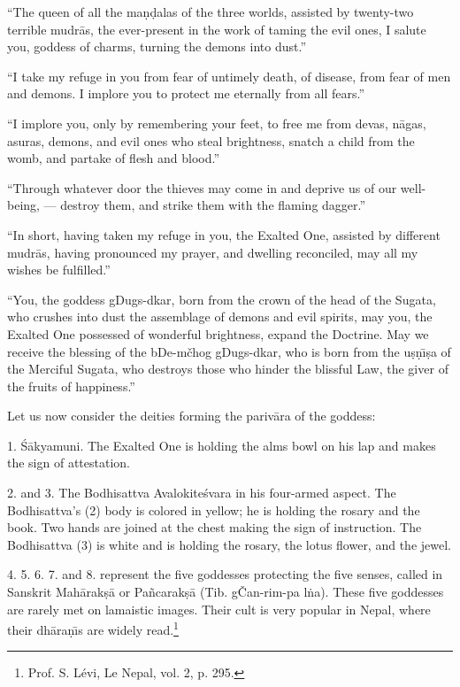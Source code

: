 \documentclass[a4paper, 12pt, oneside]{article}
\begin{document}
``The queen of all the ma\d{n}\d{d}alas of the three worlds, assisted by twenty-two terrible mudr\={a}s, the ever-present in the work of taming the evil ones, I salute you, goddess of charms, turning the demons into dust.''

``I take my refuge in you from fear of untimely death, of disease, from fear of men and demons. I implore you to protect me eternally from all fears.''

``I implore you, only by remembering your feet, to free me from devas, n\={a}gas, asuras, demons, and evil ones who steal brightness, snatch a child from the womb, and partake of flesh and blood.''

``Through whatever door the thieves may come in and deprive us of our well-being, --- destroy them, and strike them with the flaming dagger.''

``In short, having taken my refuge in you, the Exalted One, assisted by different mudr\={a}s, having pronounced my prayer, and dwelling reconciled, may all my wishes be fulfilled.''

``You, the goddess gDugs-dkar, born from the crown of the head of the Sugata, who crushes into dust the assemblage of demons and evil spirits, may you, the Exalted One possessed of wonderful brightness, expand the Doctrine. May we receive the blessing of the bDe-mčhog gDugs-dkar, who is born from the u\d{s}\d{n}\={\i}\d{s}a of the Merciful Sugata, who destroys those who hinder the blissful Law, the giver of the fruits of happiness.''

Let us now consider the deities forming the pariv\={a}ra of the goddess:

1. \'{S}\={a}kyamuni. The Exalted One is holding the alms bowl on his lap and makes the sign of attestation.

2. and 3. The Bodhisattva Avalokite\'{s}vara in his four-armed aspect. The Bodhisattva's (2) body is colored in yellow; he is holding the rosary and the book. Two hands are joined at the chest making the sign of instruction. The Bodhisattva (3) is white and is holding the rosary, the lotus flower, and the jewel.

4. 5. 6. 7. and 8. represent the five goddesses protecting the five senses, called in Sanskrit Mah\={a}rak\d{s}\={a} or Pa\~{n}carak\d{s}\={a} (Tib. gČan-rim-pa l\.{n}a). These five goddesses are rarely met on lamaistic images. Their cult is very popular in Nepal, where their dh\={a}ra\d{n}\={\i}s are widely read.\footnote{Prof. S. Lévi, Le Nepal, vol. 2, p. 295.}
\end{document}
